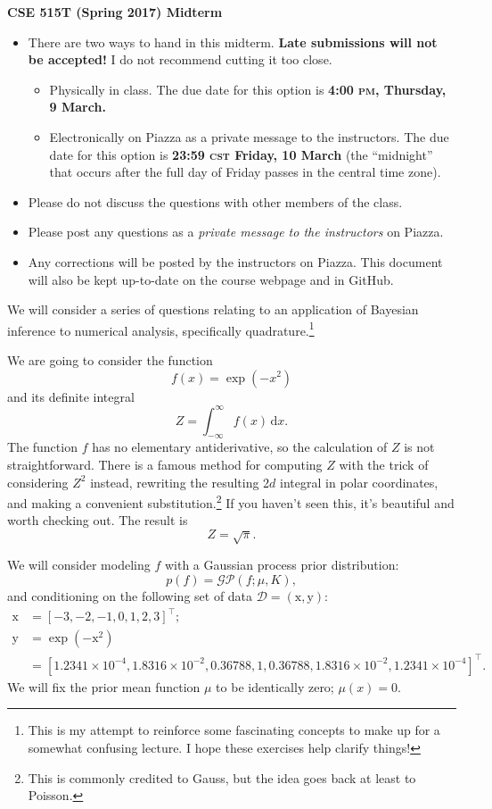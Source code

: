 \documentclass{article}
\newcommand{\acro}[1]{\textsc{\MakeLowercase{#1}}}
\newcommand{\mc}[1]{\mathcal{#1}}
\newcommand{\data}{\mc{D}}
\newcommand{\trans}{^\top}
\newcommand{\intd}[1]{\,\mathrm{d}{#1}}
\renewcommand{\vec}[1]{\bm{\mathrm{#1}}}
\begin{document}
{\large \textbf{CSE 515T (Spring 2017) Midterm}}
\begin{itemize}
\item
  There are two ways to hand in this midterm.  \textbf{Late
    submissions will not be accepted!}  I do not recommend cutting it
  too close.
  \begin{itemize}
  \item Physically in class.  The due date for this option is
    \textbf{4:00 \acro{PM}, Thursday, 9 March.}
  \item Electronically on Piazza as a private message to the
    instructors. The due date for this option is \textbf{23:59
      \acro{CST} Friday, 10 March} (the ``midnight'' that occurs after
    the full day of Friday passes in the central time zone).
  \end{itemize}
\item
  Please do not discuss the questions with other members of the class.
\item
  Please post any questions as a \emph{private message to the
    instructors} on Piazza.
\item
  Any corrections will be posted by the instructors on Piazza. This
  document will also be kept up-to-date on the course webpage and in
  GitHub.
\end{itemize}

\clearpage

We will consider a series of questions relating to an application of
Bayesian inference to numerical analysis, specifically
quadrature.\footnote{This is my attempt to reinforce some fascinating
  concepts to make up for a somewhat confusing lecture.  I hope these
  exercises help clarify things!}

We are going to consider the function
\[f(x) = \exp(-x^2)\]
and its definite integral
\[Z = \int_{-\infty}^\infty f(x) \intd x.\]
The function $f$ has no elementary antiderivative, so the calculation
of $Z$ is not straightforward. There is a famous method for computing
$Z$ with the trick of considering $Z^2$ instead, rewriting the
resulting 2$d$ integral in polar coordinates, and making a convenient
substitution.\footnote{This is commonly credited to Gauss, but the
  idea goes back at least to Poisson.} If you haven't seen this, it's
beautiful and worth checking out. The result is
\[Z = \sqrt{\pi}.\]

We will consider modeling $f$ with a Gaussian process prior
distribution:
\[p(f) = \mc{GP}(f; \mu, K),\]
and conditioning on the following set of data $\data = (\vec{x},
\vec{y})$:
\begin{align*}
  \vec{x} &= [-3, -2, -1, 0, 1, 2, 3]\trans; \\
  \vec{y} &= \exp(-\vec{x}^2) \\
          &= [1.2341 \times 10^{-4}, 1.8316 \times 10^{-2}, 0.36788, 1,
              0.36788, 1.8316 \times 10^{-2}, 1.2341 \times 10^{-4}]\trans.
\end{align*}
We will fix the prior mean function $\mu$ to be identically zero;
$\mu(x) = 0$.
\end{document}
